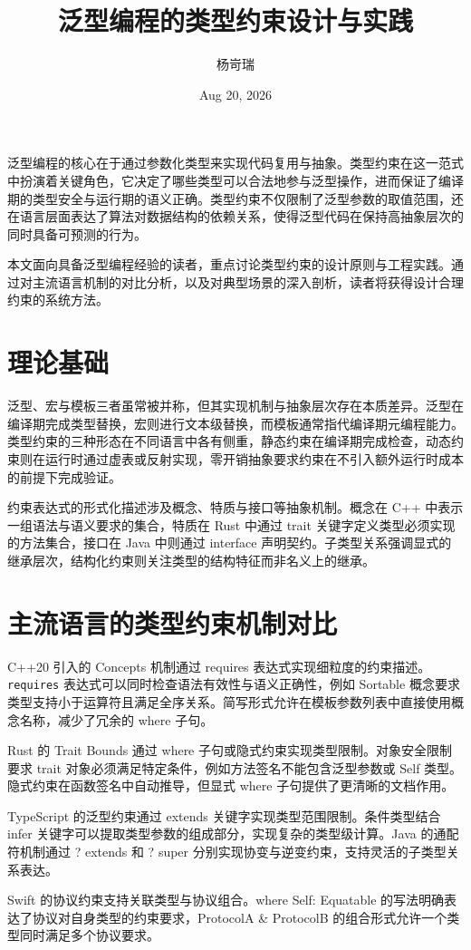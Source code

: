 \title{泛型编程的类型约束设计与实践}
\author{杨岢瑞}
\date{Aug 20, 2026}
\maketitle
泛型编程的核心在于通过参数化类型来实现代码复用与抽象。类型约束在这一范式中扮演着关键角色，它决定了哪些类型可以合法地参与泛型操作，进而保证了编译期的类型安全与运行期的语义正确。类型约束不仅限制了泛型参数的取值范围，还在语言层面表达了算法对数据结构的依赖关系，使得泛型代码在保持高抽象层次的同时具备可预测的行为。\par
本文面向具备泛型编程经验的读者，重点讨论类型约束的设计原则与工程实践。通过对主流语言机制的对比分析，以及对典型场景的深入剖析，读者将获得设计合理约束的系统方法。\par
\chapter{理论基础}
泛型、宏与模板三者虽常被并称，但其实现机制与抽象层次存在本质差异。泛型在编译期完成类型替换，宏则进行文本级替换，而模板通常指代编译期元编程能力。类型约束的三种形态在不同语言中各有侧重，静态约束在编译期完成检查，动态约束则在运行时通过虚表或反射实现，零开销抽象要求约束在不引入额外运行时成本的前提下完成验证。\par
约束表达式的形式化描述涉及概念、特质与接口等抽象机制。概念在 C++ 中表示一组语法与语义要求的集合，特质在 Rust 中通过 trait 关键字定义类型必须实现的方法集合，接口在 Java 中则通过 interface 声明契约。子类型关系强调显式的继承层次，结构化约束则关注类型的结构特征而非名义上的继承。\par
\chapter{主流语言的类型约束机制对比}
C++20 引入的 Concepts 机制通过 requires 表达式实现细粒度的约束描述。\texttt{requires} 表达式可以同时检查语法有效性与语义正确性，例如 Sortable 概念要求类型支持小于运算符且满足全序关系。简写形式允许在模板参数列表中直接使用概念名称，减少了冗余的 where 子句。\par
Rust 的 Trait Bounds 通过 where 子句或隐式约束实现类型限制。对象安全限制要求 trait 对象必须满足特定条件，例如方法签名不能包含泛型参数或 Self 类型。隐式约束在函数签名中自动推导，但显式 where 子句提供了更清晰的文档作用。\par
TypeScript 的泛型约束通过 extends 关键字实现类型范围限制。条件类型结合 infer 关键字可以提取类型参数的组成部分，实现复杂的类型级计算。Java 的通配符机制通过 ? extends 和 ? super 分别实现协变与逆变约束，支持灵活的子类型关系表达。\par
Swift 的协议约束支持关联类型与协议组合。where Self: Equatable 的写法明确表达了协议对自身类型的约束要求，ProtocolA \&{} ProtocolB 的组合形式允许一个类型同时满足多个协议要求。\par

